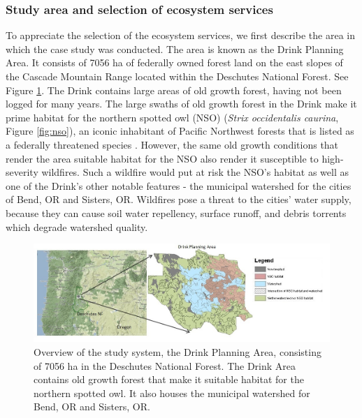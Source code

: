 \subsubsection{Study area and selection of ecosystem services}
\label{subsec:studyArea}
To appreciate the selection of the ecosystem services, we first describe the area in which the case study was conducted. The area is known as the Drink Planning Area. It consists of 7056 ha of federally owned forest land on the east slopes of the Cascade Mountain Range located within the Deschutes National Forest. See Figure \ref{fig:drinkOverview}. The Drink contains large areas of old growth forest, having not been logged for many years. The large swaths of old growth forest in the Drink make it prime habitat for the northern spotted owl (NSO) (\textit{Strix occidentalis caurina}, Figure \ref{fig:nso}), an iconic %
inhabitant of Pacific Northwest forests that is listed as a federally threatened species \cite{congress1973endangered}. However, the same old growth conditions that render the area suitable habitat for the NSO also render it susceptible to high-severity wildfires. Such a wildfire would put at risk the NSO's habitat \cite{courtney2004scientific} as well as one of the Drink's other notable features - the municipal watershed for the cities of Bend, OR and Sisters, OR. Wildfires pose a threat to the cities' water supply, because they can cause soil water repellency, surface runoff, and debris torrents \cite{ice2004effects} which degrade watershed quality.

\begin{figure}[ht]
\centering
\includegraphics[width=.9\textwidth]{../images/Drink_Overview}
\caption[Overview of the study system, the Drink Planning Area]{Overview of the study system, the Drink Planning Area, consisting of 7056 ha in the Deschutes National Forest. The Drink Area contains old growth forest that make it suitable habitat for the northern spotted owl. It also houses the municipal watershed for Bend, OR and Sisters, OR.}
\label{fig:drinkOverview}
\end{figure}

